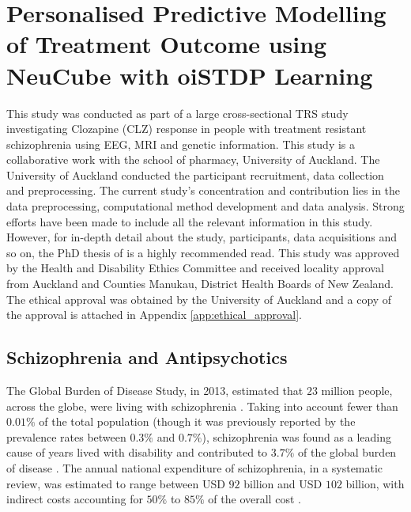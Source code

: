 \section{Personalised Predictive Modelling of Treatment Outcome using NeuCube with oiSTDP Learning}
\label{subsec:case-study}

This study was conducted as part of a large cross-sectional TRS study investigating Clozapine (CLZ) response in people with treatment resistant schizophrenia using EEG, MRI and genetic information. This study is a collaborative work with the school of pharmacy, University of Auckland. The University of Auckland conducted the participant recruitment, data collection and preprocessing. The current study's concentration and contribution lies in the data preprocessing, computational method development and data analysis. Strong efforts have been made to include all the relevant information in this study. However, for in-depth detail about the study, participants, data acquisitions and so on, the PhD thesis of \citet{mcnabb2017thesis} is a highly recommended read. This study was approved by the Health and Disability Ethics Committee and received locality approval from Auckland and Counties Manukau, District Health Boards of New Zealand. The ethical approval was obtained by the University of Auckland and a copy of the approval is attached in Appendix \ref{app:ethical_approval}.

\subsection{Schizophrenia and Antipsychotics}

The Global Burden of Disease Study, in 2013, estimated that $23$ million people, across the globe, were living with schizophrenia \citep{vos2015global}. Taking into account fewer than $0.01\%$ of the total population (though it was previously reported by \citet{mcgrath2008schizophrenia} the prevalence rates between $0.3\%$ and $0.7\%$), schizophrenia was found as a leading cause of years lived with disability and contributed to $3.7\%$ of the global burden of disease \citep{vos2015global}. The annual national expenditure of schizophrenia, in a systematic review, was estimated to range between USD $92$ billion and USD $102$ billion, with indirect costs accounting for $50\%$ to $85\%$ of the overall cost \citep{chong2016global}.

